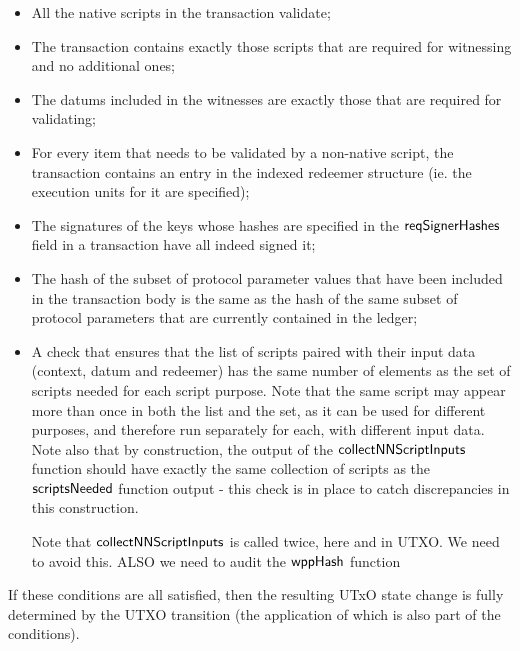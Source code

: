 \begin{itemize}

\item All the native scripts in the transaction validate;

\item The transaction contains exactly those scripts that are required for witnessing and no
additional ones;

    \item The datums included in the witnesses are exactly those that are required for validating;

    \item For every item that needs to be validated by a non-native script, the transaction contains
      an entry in the indexed redeemer structure (ie. the execution units for it are specified);

    \item The signatures of the keys whose hashes are specified in the
    $\mathsf{reqSignerHashes}$ field in a transaction
    have all indeed signed it;

    \item
    The hash of the subset of protocol parameter values that have been included in the transaction body is the same as
    the hash of the same subset of protocol parameters that are currently contained in the ledger;

    \item A check that ensures that the list of scripts paired with their input data (context, datum and redeemer)
    has the same number of elements as the set of scripts needed for each script purpose. Note that the same
    script may appear more than once in both the list and the set, as it can be used for different purposes, and therefore
    run separately for each, with different input data. Note also that by construction, the output of
    the $\mathsf{collectNNScriptInputs}$ function should have exactly the same collection of scripts as
    the $\mathsf{scriptsNeeded}$ function output - this check is in place to catch discrepancies in this construction.
    \begin{note}
      Note that $\mathsf{collectNNScriptInputs}$ is called twice, here and in UTXO. We need to avoid this.
      ALSO we need to audit the $\mathsf{wppHash}$ function
    \end{note}
\end{itemize}

If these conditions are all satisfied, then the resulting UTxO state change is fully determined
by the UTXO transition (the application of which is also part of the conditions).

